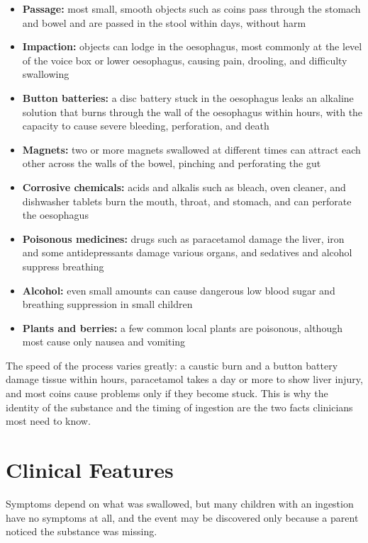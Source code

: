 \begin{itemize}
    \item \textbf{Passage:} most small, smooth objects such as coins pass through the stomach and bowel and are passed in the stool within days, without harm
    \item \textbf{Impaction:} objects can lodge in the oesophagus, most commonly at the level of the voice box or lower oesophagus, causing pain, drooling, and difficulty swallowing
    \item \textbf{Button batteries:} a disc battery stuck in the oesophagus leaks an alkaline solution that burns through the wall of the oesophagus within hours, with the capacity to cause severe bleeding, perforation, and death
    \item \textbf{Magnets:} two or more magnets swallowed at different times can attract each other across the walls of the bowel, pinching and perforating the gut
    \item \textbf{Corrosive chemicals:} acids and alkalis such as bleach, oven cleaner, and dishwasher tablets burn the mouth, throat, and stomach, and can perforate the oesophagus
    \item \textbf{Poisonous medicines:} drugs such as paracetamol damage the liver, iron and some antidepressants damage various organs, and sedatives and alcohol suppress breathing
    \item \textbf{Alcohol:} even small amounts can cause dangerous low blood sugar and breathing suppression in small children
    \item \textbf{Plants and berries:} a few common local plants are poisonous, although most cause only nausea and vomiting
\end{itemize}

The speed of the process varies greatly: a caustic burn and a button battery damage tissue within hours, paracetamol takes a day or more to show liver injury, and most coins cause problems only if they become stuck. This is why the identity of the substance and the timing of ingestion are the two facts clinicians most need to know.

\section*{Clinical Features}
Symptoms depend on what was swallowed, but many children with an ingestion have no symptoms at all, and the event may be discovered only because a parent noticed the substance was missing.

